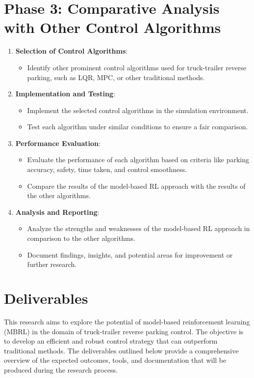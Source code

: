 \section*{Phase 3: Comparative Analysis with Other Control Algorithms}
\begin{enumerate}
    \item \textbf{Selection of Control Algorithms}:
    \begin{itemize}
        \item Identify other prominent control algorithms used for truck-trailer reverse parking, such as LQR, MPC, or other traditional methods.
    \end{itemize}
    
    \item \textbf{Implementation and Testing}:
    \begin{itemize}
        \item Implement the selected control algorithms in the simulation environment.
        \item Test each algorithm under similar conditions to ensure a fair comparison.
    \end{itemize}
    
    \item \textbf{Performance Evaluation}:
    \begin{itemize}
        \item Evaluate the performance of each algorithm based on criteria like parking accuracy, safety, time taken, and control smoothness.
        \item Compare the results of the model-based RL approach with the results of the other algorithms.
    \end{itemize}
    
    \item \textbf{Analysis and Reporting}:
    \begin{itemize}
        \item Analyze the strengths and weaknesses of the model-based RL approach in comparison to the other algorithms.
        \item Document findings, insights, and potential areas for improvement or further research.
    \end{itemize}
\end{enumerate}


\section{Deliverables}
This research aims to explore the potential of model-based reinforcement learning (MBRL) in the domain of truck-trailer reverse parking control. The objective is to develop an efficient and robust control strategy that can outperform traditional methods. The deliverables outlined below provide a comprehensive overview of the expected outcomes, tools, and documentation that will be produced during the research process.

